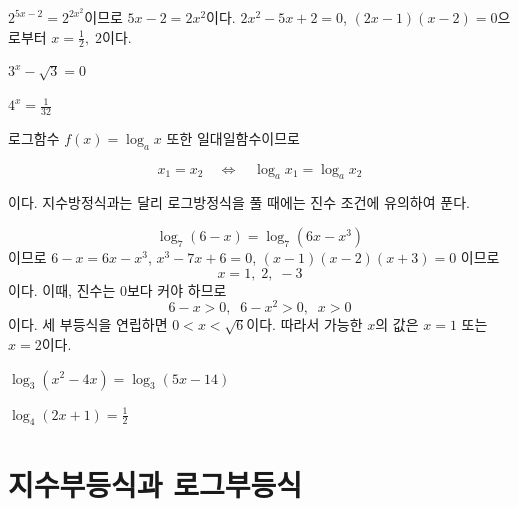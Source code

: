 \documentclass{oblivoir}
\begin{document}
%
\label{equa1}
\begin{mdframed}
\(2^{5x-2}=2^{2x^2}\)이므로 \(5x-2=2x^2\)이다.
\(2x^2-5x+2=0\), \((2x-1)(x-2)=0\)으로부터 \(x=\frac12,\;2\)이다.
\end{mdframed}

%
\label{equa2}
\begin{enumerate*}[itemjoin=\tabto{.5\textwidth}]
\item
\(3^x-\sqrt3=0\)
\item
\(4^x=\frac1{32}\)
\end{enumerate*}

\newpage
로그함수 \(f(x)=\log_ax\) 또한 일대일함수이므로
\begin{mdframed}[innertopmargin=0pt,leftmargin=.1\textwidth,rightmargin=.1\textwidth]
\[x_1=x_2\quad\Longleftrightarrow\quad \log_a{x_1}=\log_a{x_2}\]
\end{mdframed}
이다.
지수방정식과는 달리 로그방정식을 풀 때에는 진수 조건에 유의하여 푼다.

%
\label{equa3}
\begin{mdframed}
\[\log_7(6-x)=\log_7(6x-x^3)\]이므로 \(6-x=6x-x^3\), \(x^3-7x+6=0\), \((x-1)(x-2)(x+3)=0\)
이므로 \[x=1,\;2,\;-3\]이다.
이때, 진수는 0보다 커야 하므로 \[6-x>0,\;\;6-x^2>0,\;\;x>0\]이다.
세 부등식을 연립하면 \(0<x<\sqrt6\)이다.
따라서 가능한 \(x\)의 값은 \(x=1\) 또는 \(x=2\)이다.
\end{mdframed}

%
\label{equa4}
\begin{enumerate*}[itemjoin=\tabto{.5\textwidth}]
\item
\(\log_3(x^2-4x)=\log_3(5x-14)\)
\item
\(\log_4(2x+1)=\frac12\)
\end{enumerate*}

\section{지수부등식과 로그부등식}
\end{document}

